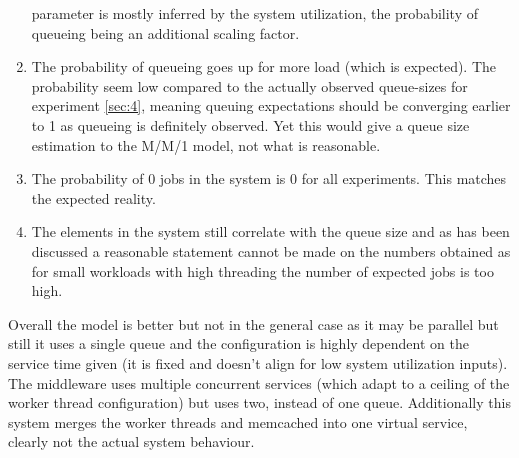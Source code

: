 \begin{enumerate}
                  parameter is mostly inferred by the system utilization, the probability of queueing being an
                  additional scaling factor.
            \item The probability of queueing goes up for more load (which is expected). The probability seem low
                  compared to the actually observed queue-sizes for experiment \ref{sec:4}, meaning queuing expectations
                  should be converging earlier to 1 as queueing is definitely observed. Yet this would give a queue size
                  estimation to the M/M/1 model, not what is reasonable.
            \item The probability of 0 jobs in the system is 0 for all experiments. This matches the expected reality.
            \item The elements in the system still correlate with the queue size and as has been discussed a reasonable
                  statement cannot be made on the numbers obtained as for small workloads with high threading the number
                  of expected jobs is too high.
        \end{enumerate}

        Overall the model is better but not in the general case  as it may be parallel but still it uses a single queue
        and the configuration is highly dependent on the service time given (it is fixed and doesn't align for low
        system utilization inputs). The middleware uses multiple concurrent services (which adapt to a ceiling of
        the worker thread configuration) but uses two, instead of one queue. Additionally this system merges the worker
        threads and memcached into one virtual service, clearly not the actual system behaviour.

